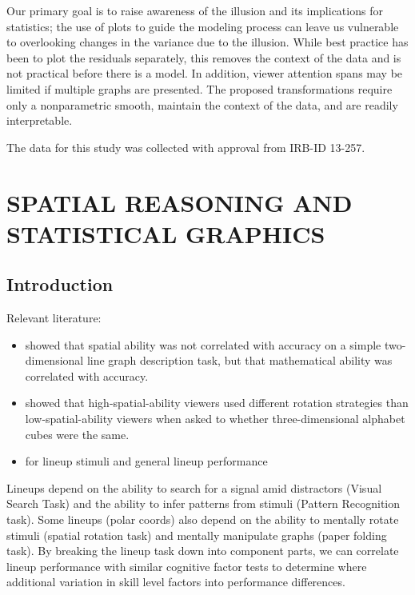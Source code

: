 \documentclass[11pt]{isuthesis}\usepackage[]{graphicx}\usepackage[]{color}
\begin{document}
Our primary goal is to raise awareness of the illusion and its implications for statistics; the use of plots to guide the modeling process can leave us vulnerable to overlooking changes in the variance due to the illusion. While best practice has  been to plot the residuals separately, this removes the context of the data and is not practical before there is a model. In addition, viewer attention spans may be limited if multiple graphs are presented. The proposed transformations require only a nonparametric smooth, maintain the context of the data, and are readily interpretable. 

The data for this study was collected with approval from  IRB-ID 13-257.



\graphicspath{{Figure/VisualAptitude/}{Images/VisualAptitude/}}
\renewcommand{\floatpagefraction}{.99}





\chapter{SPATIAL REASONING AND STATISTICAL GRAPHICS}\label{VisualAptitude}\label{visualreasoning}

\section{Introduction}
Relevant literature: 
\begin{itemize}
\item \citet{shah1995conceptual} showed that spatial ability was not correlated with accuracy on a simple two-dimensional line graph description task, but that mathematical ability was correlated with accuracy. 
\item \citet{just1985cognitive} showed that high-spatial-ability viewers used different rotation strategies than low-spatial-ability viewers when asked to whether three-dimensional alphabet cubes were the same. 
\item \citet{hofmann2012graphical} for lineup stimuli and general lineup performance
\end{itemize}

Lineups depend on the ability to search for a signal amid distractors (Visual Search Task) and the ability to infer patterns from stimuli (Pattern Recognition task). Some lineups (polar coords) also depend on the ability to mentally rotate stimuli (spatial rotation task) and mentally manipulate graphs (paper folding task). By breaking the lineup task down into component parts, we can correlate lineup performance with similar cognitive factor tests to determine where additional variation in skill level factors into performance differences. 
\end{document}
